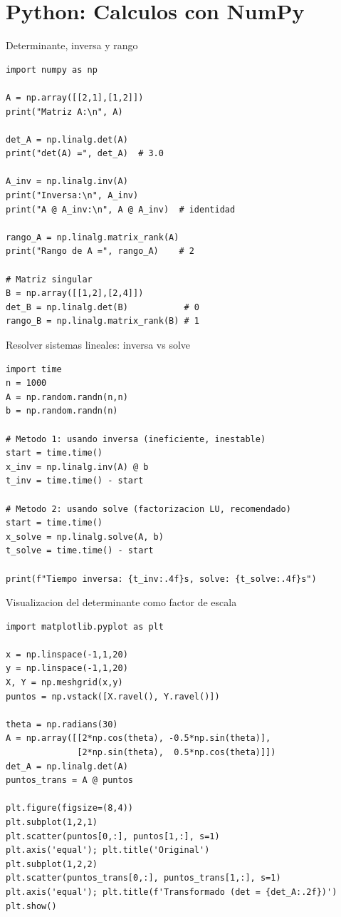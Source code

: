\documentclass[aspectratio=169, 10pt, xcolor=table]{beamer}
\begin{document}
\section{Python: Calculos con NumPy}

\begin{frame}[fragile]{Determinante, inversa y rango}
    \begin{lstlisting}
import numpy as np

A = np.array([[2,1],[1,2]])
print("Matriz A:\n", A)

det_A = np.linalg.det(A)
print("det(A) =", det_A)  # 3.0

A_inv = np.linalg.inv(A)
print("Inversa:\n", A_inv)
print("A @ A_inv:\n", A @ A_inv)  # identidad

rango_A = np.linalg.matrix_rank(A)
print("Rango de A =", rango_A)    # 2

# Matriz singular
B = np.array([[1,2],[2,4]])
det_B = np.linalg.det(B)           # 0
rango_B = np.linalg.matrix_rank(B) # 1
    \end{lstlisting}
\end{frame}

\begin{frame}[fragile]{Resolver sistemas lineales: inversa vs solve}
    \begin{lstlisting}
import time
n = 1000
A = np.random.randn(n,n)
b = np.random.randn(n)

# Metodo 1: usando inversa (ineficiente, inestable)
start = time.time()
x_inv = np.linalg.inv(A) @ b
t_inv = time.time() - start

# Metodo 2: usando solve (factorizacion LU, recomendado)
start = time.time()
x_solve = np.linalg.solve(A, b)
t_solve = time.time() - start

print(f"Tiempo inversa: {t_inv:.4f}s, solve: {t_solve:.4f}s")
    \end{lstlisting}
\end{frame}

\begin{frame}[fragile]{Visualizacion del determinante como factor de escala}
    \begin{lstlisting}
import matplotlib.pyplot as plt

x = np.linspace(-1,1,20)
y = np.linspace(-1,1,20)
X, Y = np.meshgrid(x,y)
puntos = np.vstack([X.ravel(), Y.ravel()])

theta = np.radians(30)
A = np.array([[2*np.cos(theta), -0.5*np.sin(theta)],
              [2*np.sin(theta),  0.5*np.cos(theta)]])
det_A = np.linalg.det(A)
puntos_trans = A @ puntos

plt.figure(figsize=(8,4))
plt.subplot(1,2,1)
plt.scatter(puntos[0,:], puntos[1,:], s=1)
plt.axis('equal'); plt.title('Original')
plt.subplot(1,2,2)
plt.scatter(puntos_trans[0,:], puntos_trans[1,:], s=1)
plt.axis('equal'); plt.title(f'Transformado (det = {det_A:.2f})')
plt.show()
    \end{lstlisting}
\end{frame}
\end{document}
